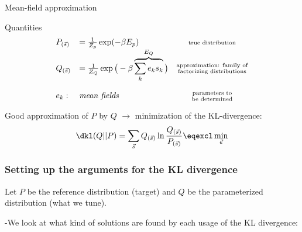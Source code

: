 \begin{frame}{Mean-field approximation}
\begin{block}{Quantities}
\begin{equation}
	\begin{array}{llc}
	P_{(\vec{s})} 
	& = \frac{1}{Z_p} \exp(-\beta E_p) 
	& \substack{ \text{true distribution} } \\
	Q_{(\vec{s})} 
	& = \frac{1}{Z_Q} \exp\big(-\beta \overbrace{\sum\limits_k e_k s_k}^{E_Q} \big)
	& \substack{ \text{approximation: family of} \\ \text{factorizing distributions} } \\\\
	e_k:
	& \text{\textit{mean fields} }
	& \substack{ \text{parameters to} \\ \text{be determined} }
	\end{array}
\end{equation}
\end{block}
\begin{block}{Good approximation of $P$ by $Q$}
\vspace{0.1cm}
$\rightarrow$ minimization of the KL-divergence:
\begin{equation}
	\dkl(Q||P) = \sum\limits_{\vec{s}} Q_{(\vec{s})} \ln \frac{Q_{(\vec{s})}}{
		P_{(\vec{s})}} \eqexcl \min_{\vec{e}}
\end{equation}
\end{block}
\end{frame}

\subsubsection{Setting up the arguments for the KL divergence}

\begin{frame}{\subsubsecname}

Let $P$ be the reference distribution (target) and $Q$ be the parameterized distribution (what we tune).


\pause

-We look at what kind of solutions are found by each usage of the KL divergence:  


\end{frame}

